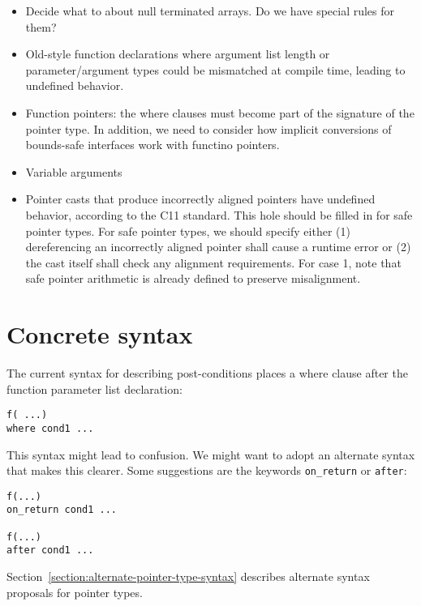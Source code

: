 \begin{itemize}
\item
  Decide what to about null terminated arrays. Do we have special rules
  for them?
\item
  Old-style function declarations where argument list length or
  parameter/argument types could be mismatched at compile time, leading
  to undefined behavior.
\item
  Function pointers: the where clauses must become part of the signature
  of the pointer type.  In addition, we need to consider how implicit
  conversions of bounds-safe interfaces work with functino pointers.
\item
  Variable arguments
\item
  Pointer casts that produce incorrectly aligned pointers have undefined
  behavior, according to the C11 standard. This hole should be filled in
  for safe pointer types. For safe pointer types, we should specify
  either (1) dereferencing an incorrectly aligned pointer shall cause a
  runtime error or (2) the cast itself shall check any alignment
  requirements. For case 1, note that safe pointer arithmetic is already
  defined to preserve misalignment.
\end{itemize}

\section{Concrete syntax}
 
The current syntax for describing post-conditions places a where clause
after the function parameter list declaration:

\begin{verbatim}
f( ...)
where cond1 ...
\end{verbatim}

This syntax might lead to confusion. We might want to adopt an alternate
syntax that makes this clearer. Some suggestions are the keywords
\texttt{on\_return} or \texttt{after}:

\begin{verbatim}
f(...)
on_return cond1 ...

f(...)
after cond1 ...
\end{verbatim}

Section~\ref{section:alternate-pointer-type-syntax} describes alternate
syntax proposals for pointer types.
